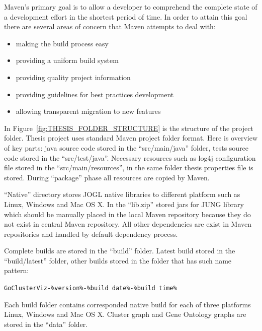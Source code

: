 Maven's primary goal is to allow a developer to comprehend the complete state of a development effort in the shortest period of time. In order to attain this goal there are several areas of concern that Maven attempts to deal with:
\begin{itemize}
	\item making the build process easy
	\item providing a uniform build system
	\item providing quality project information
	\item providing guidelines for best practices development
	\item allowing transparent migration to new features
\end{itemize}


In Figure~\ref{fig:THESIS_FOLDER_STRUCTURE} is the structure of the project folder. Thesis project uses standard Maven project folder format. Here is overview of key parts: java source code stored in the ``src/main/java'' folder, tests source code stored in the ``src/test/java''. Necessary resources such as log4j configuration file stored in the ``src/main/resources'', in the same folder thesis properties file is stored. During ``package'' phase all resources are copied by Maven.


``Native'' directory stores JOGL native libraries to different platform such as Linux, Windows and Mac OS X. In the ``lib.zip'' stored jars for JUNG library which should be manually placed in the local Maven repository because they do not  exist in central Maven repository. All other dependencies are exist in Maven repositories and handled by default dependency process.


Complete builds are stored in the ``build'' folder. Latest build stored in the ``build/latest'' folder, other builds stored in the folder that has such name pattern:


\texttt{GoClusterViz-\%version\%-\%build date\%-\%build time\%}


Each build folder contains corresponded native build for each of three platforms Linux, Windows and Mac OS X. Cluster graph and Gene Ontology graphs are stored in the ``data'' folder.

